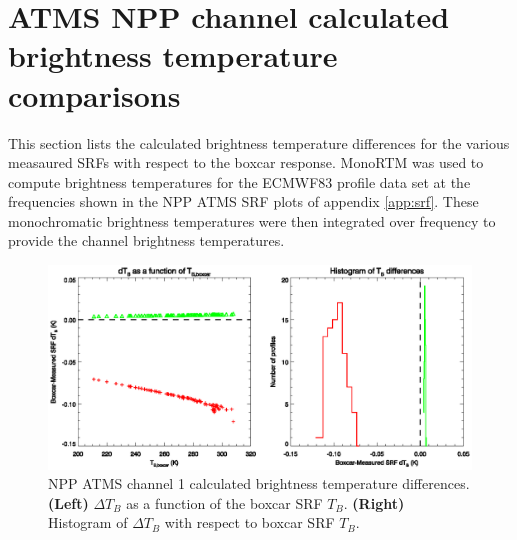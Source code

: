 \section{ATMS NPP channel calculated brightness temperature comparisons}
\label{app:dtb}
This section lists the calculated brightness temperature differences for the various measaured SRFs with respect to the boxcar response. MonoRTM \cite{Clough_2005} was used to compute brightness temperatures for the ECMWF83 profile data set \cite{ECMWF_profile_set2,Matricardi_ECMWF564} at the frequencies shown in the NPP ATMS SRF plots of appendix \ref{app:srf}. These monochromatic brightness temperatures were then integrated over frequency to provide the channel brightness temperatures.

\newpage


\begin{figure}[H]
  \centering
  \includegraphics[scale=1]{graphics/dtb/atms_npp.ch1.TbStats.eps}
  \caption{NPP ATMS channel 1 calculated brightness temperature differences. \textbf{(Left)} $\Delta T_B$ as a function of the boxcar SRF $T_B$. \textbf{(Right)} Histogram of $\Delta T_B$ with respect to boxcar SRF $T_B$.}
  \label{fig:atms_npp.ch1.dtb}
\end{figure}

